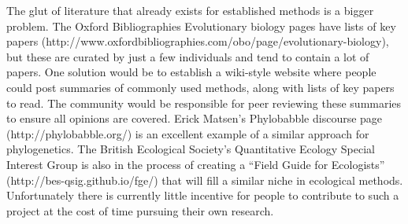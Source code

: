 \documentclass[a4paper,12pt]{article}
\begin{document}
    The glut of literature that already exists for established methods is a bigger problem.
    The Oxford Bibliographies Evolutionary biology pages have lists of key papers (http://www.oxfordbibliographies.com/obo/page/evolutionary-biology), but these are curated by just a few individuals and tend to contain a lot of papers. 
    One solution would be to establish a wiki-style website where people could post summaries of commonly used methods, along with lists of key papers to read. 
    The community would be responsible for peer reviewing these summaries to ensure all opinions are covered. 
    Erick Matsen's Phylobabble discourse page (http://phylobabble.org/) is an excellent example of a similar approach for phylogenetics. 
    The British Ecological Society's Quantitative Ecology Special Interest Group is also in the process of creating a ``Field Guide for Ecologists'' (http://bes-qsig.github.io/fge/) that will fill a similar niche in ecological methods.
    Unfortunately there is currently little incentive for people to contribute to such a project at the cost of time pursuing their own research.\\
\end{document}
